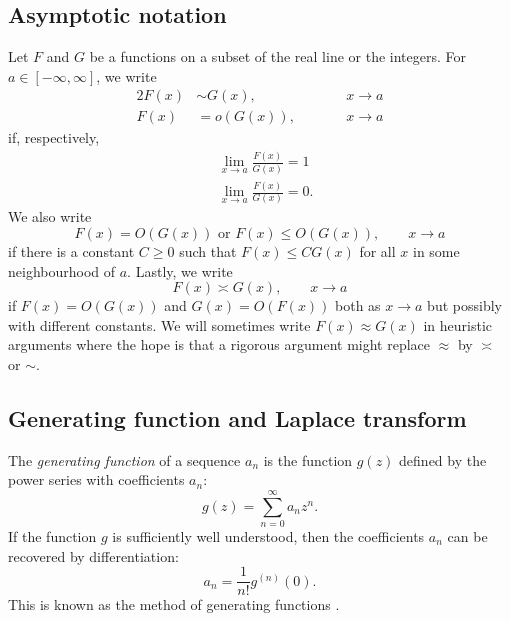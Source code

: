 
\subsection{Asymptotic notation}

Let $F$ and $G$ be a functions on a subset of the real line or the integers.
For $a\in[-\infty,\infty]$, we write
\begin{alignat}{2}
F(x) &\sim G(x), &&\qquad x \to a \\
F(x) &= o(G(x)), &&\qquad x \to a
\end{alignat}
if, respectively,
\begin{align}
&\lim_{x\to a} \frac{F(x)}{G(x)} = 1 \\
&\lim_{x\to a} \frac{F(x)}{G(x)} = 0.
\end{align}
We also write
\begin{equation}
F(x) = O(G(x))
	\text{ or }
F(x) \le O(G(x)),
	\qquad
x \to a
\end{equation}
if there is a constant $C \ge 0$ such that $F(x) \le C G(x)$ for all
$x$ in some neighbourhood of $a$. Lastly, we write
\begin{equation}
F(x) \asymp G(x),
	\qquad
x \to a
\end{equation}
if $F(x) = O(G(x))$ and $G(x) = O(F(x))$ both as $x\to a$ but possibly with
different constants. We will sometimes write $F(x) \approx G(x)$ in heuristic
arguments where the hope is that a rigorous argument might replace $\approx$
by $\asymp$ or $\sim$.


\subsection{Generating function and Laplace transform}

The \emph{generating function} of a sequence $a_n$ is the function $g(z)$ defined
by the power series with coefficients $a_n$:
\begin{equation}
g(z) = \sum_{n=0}^\infty a_n z^n.
\end{equation}
If the function $g$ is sufficiently well understood, then the coefficients $a_n$
can be recovered by differentiation:
\begin{equation}
a_n = \frac{1}{n!} g^{(n)}(0).
\end{equation}
This is known as the method of generating functions \cite{Wilf06}.

